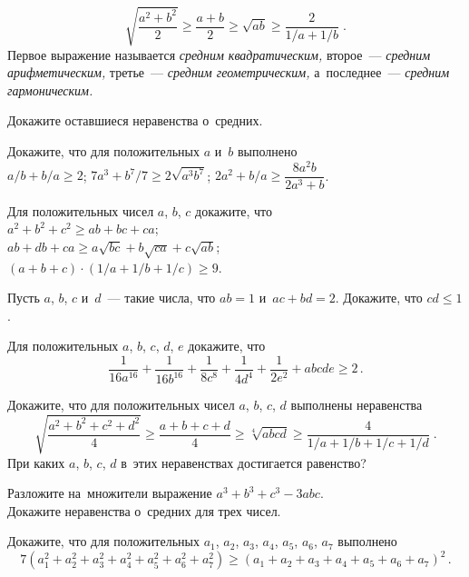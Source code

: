 


\[
    \sqrt{\frac{a^2 + b^2}{2}}
\geq
    \frac{a + b}{2}
\geq
    \sqrt{a b}
\geq
    \frac{2}{1 / a + 1 / b}
\; . \]
Первое выражение называется \emph{средним квадратическим,}
второе~--- \emph{средним арифметическим,}
третье~--- \emph{средним геометрическим,}
а~последнее~--- \emph{средним гармоническим.}

\begin{problems}

\item
Докажите оставшиеся неравенства о~средних.

\item
Докажите, что для положительных $a$ и~$b$ выполнено
\\
\subproblem
$a / b + b / a \geq 2$;
\qquad
\subproblem
$7 a^3 + b^7 / 7 \geq 2 \sqrt{a^3 b^7}$;
\qquad
\subproblem
$2 a^2 + b / a \geq \dfrac{8 a^2 b}{2 a^3 + b}$.

\item
Для положительных чисел $a$, $b$, $c$ докажите, что
\\
\subproblem
$a^2 + b^2 + c^2 \geq a b + b c + c a$;
\\
\subproblem
$a b + d b + c a \geq a \sqrt{b c} + b \sqrt{c a} + c \sqrt{a b}$;
\\
\subproblem
$(a + b + c) \cdot (1 / a + 1 / b + 1 / c) \geq 9$.

\item
Пусть $a$, $b$, $c$ и~$d$~--- такие числа, что $a b = 1$ и~$a c + b d = 2$.
Докажите, что $c d \leq 1$.

\item
Для положительных $a$, $b$, $c$, $d$, $e$ докажите, что
\[
    \frac{1}{16 a^{16}} + \frac{1}{16 b^{16}} +
    \frac{1}{8 c^{8}} + \frac{1}{4 d^{4}} + \frac{1}{2 e^{2}} +
    a b c d e
\geq
    2
\, . \]

\item
Докажите, что для положительных чисел $a$, $b$, $c$, $d$ выполнены неравенства
\[
    \sqrt{\frac{a^2 + b^2 + c^2 + d^2}{4}}
\geq
    \frac{a + b + c + d}{4}
\geq
    \sqrt[4]{a b c d}
\geq
    \frac{4}{1 / a + 1 / b + 1 / c + 1 / d}
\; . \]
При каких $a$, $b$, $c$, $d$ в~этих неравенствах достигается равенство?

\item
\subproblem
Разложите на~множители выражение $a^3 + b^3 + c^3 - 3 a b c$.
\\
\subproblem
Докажите неравенства о~средних для трех чисел.

\item
Докажите, что для положительных $a_1$, $a_2$, $a_3$, $a_4$, $a_5$, $a_6$, $a_7$
выполнено
\[
    7 (a_1^2 + a_2^2 + a_3^2 + a_4^2 + a_5^2 + a_6^2 + a_7^2)
\geq
    (a_1 + a_2 + a_3 + a_4 + a_5 + a_6 + a_7)^2
\, . \]

\end{problems}

